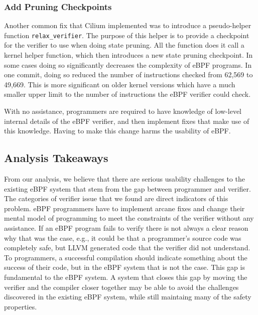 \subsubsection{Add Pruning Checkpoints}
\label{motivation:checkpoint}
Another common fix that Cilium implemented was to introduce a pseudo-helper function \texttt{relax\_verifier}.
The purpose of this helper is to provide a checkpoint for the verifier to use when doing state pruning.
All the function does it call a kernel helper function, which then introduces a new state pruning checkpoint.
In some cases doing so significantly decreases the complexity of eBPF programs.
In one commit, doing so reduced the number of instructions checked from 62,569 to 49,669.
This is more significant on older kernel versions which have a much smaller upper limit to the number of instructions the eBPF verifier could check.

With no assistance, programmers are required to have knowledge of low-level
    internal details of the eBPF verifier, and then implement fixes that
    make use of this knowledge.
Having to make this change harms the usability of eBPF.


\subsection{Analysis Takeaways}
From our analysis, we believe that there are serious usability challenges to the
    existing eBPF system that stem from the gap between programmer and verifier.
The categories of verifier issue that we found are direct indicators of this problem.
eBPF programmers have to implement arcane fixes and change their mental model of
    programming to meet the constraints of the verifier without any assistance.
If an eBPF program fails to verify there is not always a clear reason why that was the case, e.g.,
it could be that a programmer's source code was completely safe, but LLVM generated code that the verifier did not understand.
To programmers, a successful compilation should indicate something about the success of their code, but in the eBPF system that is not the case.
This gap is fundamental to the eBPF system.
A system that closes this gap by moving the verifier and the compiler closer together may be able to avoid the challenges discovered in the existing eBPF system, while still maintaing many of the safety properties.

